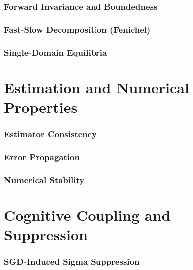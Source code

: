 \documentclass[11pt,a4paper]{article}
\begin{document}
\section{Forward Invariance and Boundedness}


\section{Fast-Slow Decomposition (Fenichel)}


\section{Single-Domain Equilibria}


\part{Estimation and Numerical Properties}

\section{Estimator Consistency}


\section{Error Propagation}


\section{Numerical Stability}


\part{Cognitive Coupling and Suppression}

\section{SGD-Induced Sigma Suppression}


\end{document}
